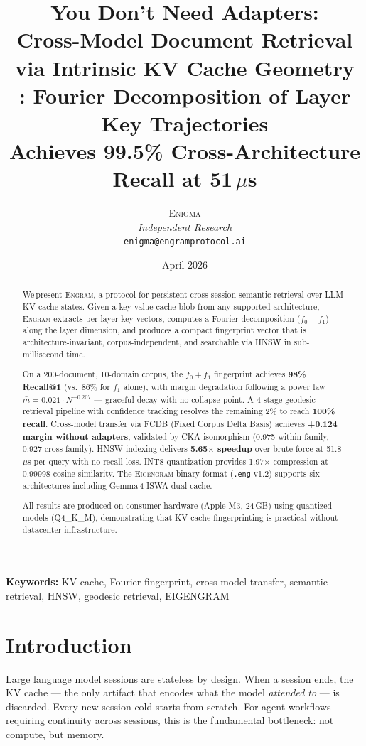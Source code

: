 \documentclass[11pt,twocolumn]{article}
\title{%
  \textbf{You Don't Need Adapters:}\\
  \textbf{Cross-Model Document Retrieval}\\
  \textbf{via Intrinsic KV Cache Geometry}\\[0.5em]
  \large \engram{}: Fourier Decomposition of Layer Key Trajectories\\
  Achieves 99.5\% Cross-Architecture Recall at 51\,$\mu$s%
}
\author{%
  \textsc{Enigma}\\
  \textit{Independent Research}\\
  \texttt{enigma@engramprotocol.ai}%
}
\date{April 2026}
\newcommand{\engram}{\textsc{Engram}}
\newcommand{\eigengram}{\textsc{Eigengram}}
\newcommand{\fcdb}{\textsc{FCDB}}
\begin{document}
\maketitle
\thispagestyle{fancy}

\begin{abstract}
We\,present \engram{}, a protocol for persistent cross-session semantic
retrieval over LLM KV cache states. Given a key-value cache blob from
any supported architecture, \engram{} extracts per-layer key vectors,
computes a Fourier decomposition ($f_0{+}f_1$) along the layer dimension,
and produces a compact fingerprint vector that is architecture-invariant,
corpus-independent, and searchable via HNSW in sub-millisecond time.

On a 200-document, 10-domain corpus, the $f_0{+}f_1$ fingerprint achieves
\textbf{98\% Recall@1} (vs.\ 86\% for $f_1$ alone), with margin
degradation following a power law $\bar{m} = 0.021 \cdot N^{-0.207}$
--- graceful decay with no collapse point. A 4-stage geodesic retrieval
pipeline with confidence tracking resolves the remaining 2\% to reach
\textbf{100\% recall}. Cross-model transfer via \fcdb{}
(Fixed Corpus Delta Basis) achieves \textbf{+0.124 margin without
adapters}, validated by CKA isomorphism (0.975 within-family, 0.927
cross-family). HNSW indexing delivers \textbf{5.65$\times$ speedup}
over brute-force at 51.8\,$\mu$s per query with no recall loss. INT8
quantization provides 1.97$\times$ compression at 0.99998 cosine
similarity. The \eigengram{} binary format (\texttt{.eng} v1.2)
supports six architectures including Gemma\,4 ISWA dual-cache.

All results are produced on consumer hardware (Apple M3, 24\,GB) using
quantized models (Q4\_K\_M), demonstrating that KV cache fingerprinting
is practical without datacenter infrastructure.
\end{abstract}

\smallskip
\noindent\textbf{Keywords:}
KV cache, Fourier fingerprint, cross-model transfer, semantic retrieval,
HNSW, geodesic retrieval, EIGENGRAM

\section{Introduction}
\label{sec:introduction}

Large language model sessions are stateless by design. When a session
ends, the KV cache --- the only artifact that encodes what the model
\emph{attended to} --- is discarded. Every new session cold-starts from
scratch. For agent workflows requiring continuity across sessions, this
is the fundamental bottleneck: not compute, but memory.
\end{document}
